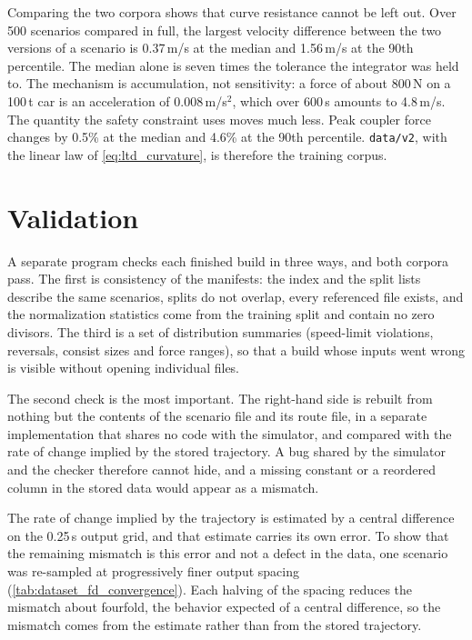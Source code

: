 Comparing the two corpora shows that curve resistance cannot be left out. Over 500 scenarios compared in full, the largest velocity difference between the two versions of a scenario is 0.37\,m/s at the median and 1.56\,m/s at the 90th percentile. The median alone is seven times the tolerance the integrator was held to. The mechanism is accumulation, not sensitivity: a force of about 800\,N on a 100\,t car is an acceleration of 0.008\,m/s$^2$, which over 600\,s amounts to 4.8\,m/s. The quantity the safety constraint uses moves much less. Peak coupler force changes by 0.5\% at the median and 4.6\% at the 90th percentile. \texttt{data/v2}, with the linear law of \cref{eq:ltd_curvature}, is therefore the training corpus.

\section{Validation}
\label{sec:dataset_validation}

A separate program checks each finished build in three ways, and both corpora pass. The first is consistency of the manifests: the index and the split lists describe the same scenarios, splits do not overlap, every referenced file exists, and the normalization statistics come from the training split and contain no zero divisors. The third is a set of distribution summaries (speed-limit violations, reversals, consist sizes and force ranges), so that a build whose inputs went wrong is visible without opening individual files.

The second check is the most important. The right-hand side is rebuilt from nothing but the contents of the scenario file and its route file, in a separate implementation that shares no code with the simulator, and compared with the rate of change implied by the stored trajectory. A bug shared by the simulator and the checker therefore cannot hide, and a missing constant or a reordered column in the stored data would appear as a mismatch.

The rate of change implied by the trajectory is estimated by a central difference on the 0.25\,s output grid, and that estimate carries its own error. To show that the remaining mismatch is this error and not a defect in the data, one scenario was re-sampled at progressively finer output spacing (\cref{tab:dataset_fd_convergence}). Each halving of the spacing reduces the mismatch about fourfold, the behavior expected of a central difference, so the mismatch comes from the estimate rather than from the stored trajectory.

